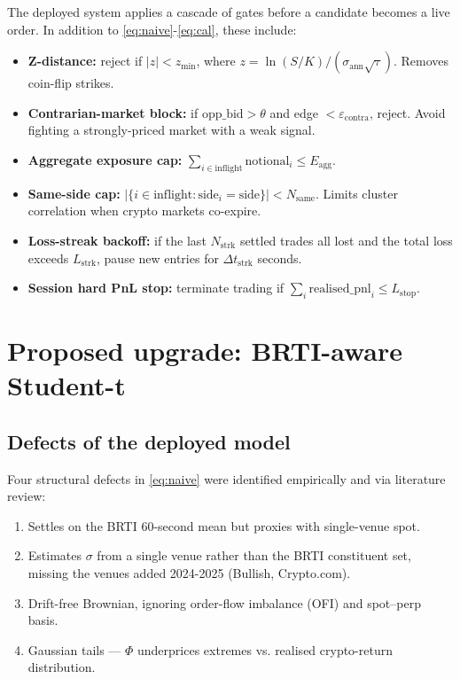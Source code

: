 \documentclass[11pt]{article}
\begin{document}
The deployed system applies a cascade of gates before a candidate becomes a live order. In addition to \eqref{eq:naive}-\eqref{eq:cal}, these include:
\begin{itemize}
\item \textbf{Z-distance:} reject if $|z| < z_{\min}$, where $z = \ln(S/K)/(\sigma_{\text{ann}}\sqrt{\tau})$. Removes coin-flip strikes.
\item \textbf{Contrarian-market block:} if $\text{opp\_bid} > \theta$ and edge $< \varepsilon_{\text{contra}}$, reject. Avoid fighting a strongly-priced market with a weak signal.
\item \textbf{Aggregate exposure cap:} $\sum_{i \in \mathrm{inflight}} \text{notional}_i \leq E_{\text{agg}}$.
\item \textbf{Same-side cap:} $|\{i \in \mathrm{inflight} : \text{side}_i = \text{side}\}| < N_{\text{same}}$. Limits cluster correlation when crypto markets co-expire.
\item \textbf{Loss-streak backoff:} if the last $N_{\text{strk}}$ settled trades all lost and the total loss exceeds $L_{\text{strk}}$, pause new entries for $\Delta t_{\text{strk}}$ seconds.
\item \textbf{Session hard PnL stop:} terminate trading if $\sum_i \mathrm{realised\_pnl}_i \leq L_{\text{stop}}$.
\end{itemize}

\section{Proposed upgrade: BRTI-aware Student-t}

\subsection{Defects of the deployed model}

Four structural defects in \eqref{eq:naive} were identified empirically and via literature review:
\begin{enumerate}
\item Settles on the BRTI 60-second mean but proxies with single-venue spot.
\item Estimates $\sigma$ from a single venue rather than the BRTI constituent set, missing the venues added 2024-2025 (Bullish, Crypto.com).
\item Drift-free Brownian, ignoring order-flow imbalance (OFI) and spot--perp basis.
\item Gaussian tails — $\Phi$ underprices extremes vs. realised crypto-return distribution.
\end{enumerate}
\end{document}
